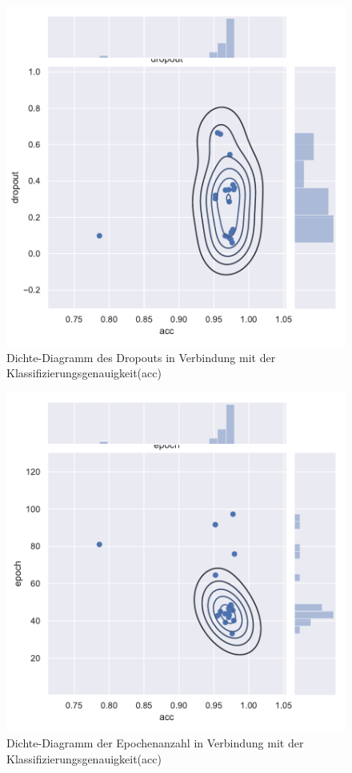 \begin{figure}[H]
  \centering  
  \includegraphics[scale=0.5]{anhang/GA_50_mnist_digits_False_big_jointplot_dropout.pdf}
  \caption{Dichte-Diagramm des Dropouts in Verbindung mit der Klassifizierungsgenauigkeit(acc)}
  
\end{figure}

\begin{figure}[H]
  \centering  
  \includegraphics[scale=0.5]{anhang/GA_50_mnist_digits_False_big_jointplot_epoch.pdf}
  \caption{Dichte-Diagramm der Epochenanzahl in Verbindung mit der Klassifizierungsgenauigkeit(acc)}
  
\end{figure}


